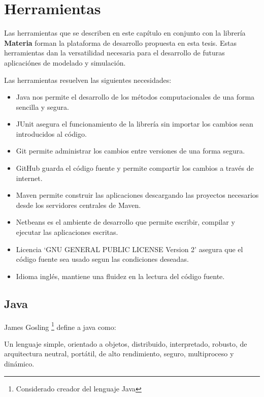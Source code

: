 \chapter{Herramientas}\label{chap:tools}

	Las herramientas que se describen en este capítulo en conjunto con la librería \textbf{Materia} forman la plataforma de desarrollo propuesta en esta tesis. Estas herramientas dan la versatilidad necesaria para el desarrollo de futuras aplicaciónes de modelado y simulación. 

	Las herramientas resuelven las siguientes necesidades:

\begin{itemize}
	\item Java nos permite el desarrollo de los métodos computacionales de una forma sencilla y segura.
	\item JUnit asegura el funcionamiento de la librería sin importar los cambios sean introducidos al código.
	\item Git permite administrar los cambios entre versiones de una forma segura.
	\item GitHub guarda el código fuente y permite compartir los cambios a través de internet.
	\item Maven permite construir las aplicaciones descargando las proyectos necesarios desde los servidores centrales de Maven.
	\item Netbeans es el ambiente de desarrollo que permite escribir, compilar y ejecutar las aplicaciones escritas.
	\item Licencia `GNU GENERAL PUBLIC LICENSE Version 2' asegura que el código fuente sea usado segun las condiciones deseadas.
	\item Idioma inglés, mantiene una fluidez en la lectura del código fuente.
\end{itemize}

	\section{Java}

		James Gosling \footnote{Considerado creador del lenguaje Java} define a java como: 

		Un lenguaje simple, orientado a objetos, distribuido, interpretado, robusto, de arquitectura neutral, portátil, de alto rendimiento, seguro, multiproceso y dinámico.\cite{java}

		

